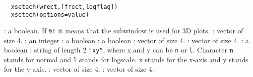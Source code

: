 \begin{mandesc}
  \\ 
\end{mandesc}
\begin{calling_sequence}
\begin{verbatim}
  xsetech(wrect,[frect,logflag])  
  xsetech(options=value)
\end{verbatim}
\end{calling_sequence}
\begin{parameters}
  \begin{varlist}
    : a boolean. If \verb!%t! it means that the subwindow is used for 3D plots.
    : vector of size 4.
    : an integer 
    : a boolean 
    : a boolean 
    : vector of size 4.
    : vector of size 4.  
    : a boolean 
    : string of length 2 \verb!"xy"!, where x and y can be \verb!n! or 
    \verb!l!. Character \verb!n! stands for normal and \verb!l! stands for logscale. x stands
    for the x-axis and y stands for the y-axis.
    : vector of size 4.
    : vector of size 4.
  \end{varlist}
\end{parameters}

